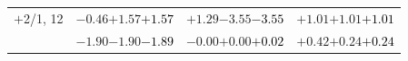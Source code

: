 \documentclass[compress]{beamer}
\begin{document}
\begin{frame}
\begin{tabular}{r | c | c | c}
$+$2/1, 12 & $-0.46$\hspace{0.1 cm}$+1.57$\hspace{0.1 cm}\textcolor{black}{$+1.57$} & $+1.29$\hspace{0.1 cm}$-3.55$\hspace{0.1 cm}\textcolor{black}{$-3.55$} & $+1.01$\hspace{0.1 cm}$+1.01$\hspace{0.1 cm}\textcolor{black}{$+1.01$} \\
           & $-1.90$\hspace{0.1 cm}$-1.90$\hspace{0.1 cm}\textcolor{black}{$-1.89$} & $-0.00$\hspace{0.1 cm}$+0.00$\hspace{0.1 cm}\textcolor{black}{$+0.02$} & $+0.42$\hspace{0.1 cm}$+0.24$\hspace{0.1 cm}\textcolor{black}{$+0.24$} \\
\end{tabular}
\end{frame}
\end{document}
